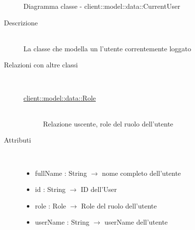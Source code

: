 \vspace{0.5cm}
\hypertarget{client::model::data::CurrentUser}{}
\begin{figure}[H]
	\centering
	\caption{Diagramma classe - client::model::data::CurrentUser}
\end{figure}\begin{description}
\item[Descrizione] \hfill \\
La classe che modella un l'utente correntemente loggato

\item[Relazioni con altre classi] \hfill \\
\vspace{-7mm}
\begin{description}
	\item[\hyperlink{client::model::data::Role}{client::model::data::Role}] \hfill \\
	Relazione uscente, role del ruolo dell'utente
\end{description}

\item[Attributi] \hfill \\
\vspace{-7mm}
\begin{itemize}
	\item fullName : String $\rightarrow$ nome completo dell'utente
	\item id : String $\rightarrow$ ID dell'User
	\item role : Role $\rightarrow$ Role del ruolo dell'utente
	\item userName : String $\rightarrow$ userName dell'utente
\end{itemize}


\end{description}
